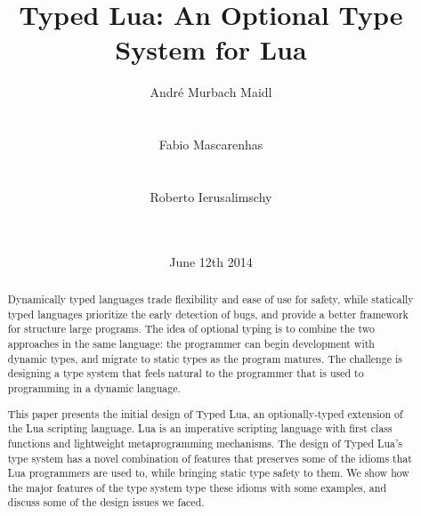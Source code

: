 \documentclass{sig-alternate}
\begin{document}

\title{Typed Lua: An Optional Type System for Lua}


\author{
\alignauthor
André Murbach Maidl\\
  \\
  \\
\alignauthor
Fabio Mascarenhas\\
  \\
  \\
\alignauthor
Roberto Ierusalimschy\\
  \\
  \\
}

\date{June 12th 2014}

\maketitle

\begin{abstract}
Dynamically typed languages trade flexibility and ease of
use for safety, while statically typed languages prioritize
the early detection of bugs, and provide a better framework
for structure large programs. The idea of optional typing
is to combine the two approaches in the same
language: the programmer can begin development with
dynamic types, and migrate to static types as the
program matures. The challenge is designing a type system
that feels natural to the programmer that is used to
programming in a dynamic language.

This paper presents the initial design of Typed Lua, an
optionally-typed extension of the Lua scripting language.
Lua is an imperative scripting language with first
class functions and lightweight metaprogramming mechanisms.
The design of Typed Lua's type system has a novel combination
of features that preserves some of the idioms that Lua
programmers are used to, while bringing static type
safety to them. We show how the major features of the
type system type these idioms with some
examples, and discuss some of the design issues we faced.
\end{abstract}
\end{document}
